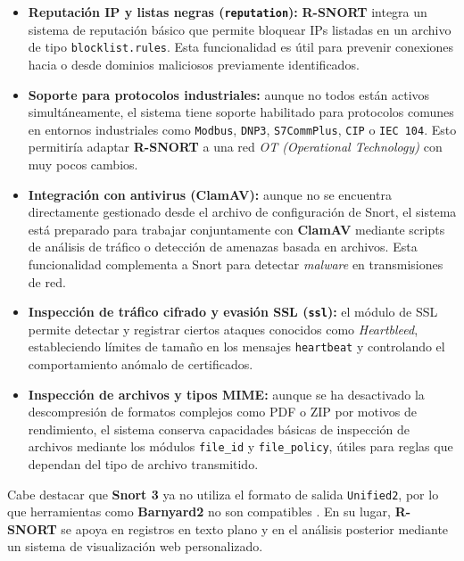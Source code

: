 \documentclass[11pt,a4paper,twoside]{report}
\begin{document}
\begin{itemize}
	\item \textbf{Reputación IP y listas negras (\texttt{reputation}):}  
	\textbf{R-SNORT} integra un sistema de reputación básico que permite bloquear IPs listadas en un archivo de tipo \texttt{blocklist.rules}. Esta funcionalidad es útil para prevenir conexiones hacia o desde dominios maliciosos previamente identificados.
	
	\item \textbf{Soporte para protocolos industriales:}  
	aunque no todos están activos simultáneamente, el sistema tiene soporte habilitado para protocolos comunes en entornos industriales como \texttt{Modbus}, \texttt{DNP3}, \texttt{S7CommPlus}, \texttt{CIP} o \texttt{IEC 104}. Esto permitiría adaptar \textbf{R-SNORT} a una red \textit{OT (Operational Technology)} con muy pocos cambios.
	
	\item \textbf{Integración con antivirus (ClamAV):}  
	aunque no se encuentra directamente gestionado desde el archivo de configuración de Snort, el sistema está preparado para trabajar conjuntamente con \textbf{ClamAV} mediante scripts de análisis de tráfico o detección de amenazas basada en archivos. Esta funcionalidad complementa a Snort para detectar \textit{malware} en transmisiones de red.
	
	\item \textbf{Inspección de tráfico cifrado y evasión SSL (\texttt{ssl}):}  
	el módulo de SSL permite detectar y registrar ciertos ataques conocidos como \textit{Heartbleed}, estableciendo límites de tamaño en los mensajes \texttt{heartbeat} y controlando el comportamiento anómalo de certificados.
	
	\item \textbf{Inspección de archivos y tipos MIME:}  
	aunque se ha desactivado la descompresión de formatos complejos como PDF o ZIP por motivos de rendimiento, el sistema conserva capacidades básicas de inspección de archivos mediante los módulos \texttt{file\_id} y \texttt{file\_policy}, útiles para reglas que dependan del tipo de archivo transmitido.
\end{itemize}

Cabe destacar que \textbf{Snort 3} ya no utiliza el formato de salida \texttt{Unified2}, por lo que herramientas como \textbf{Barnyard2} no son compatibles \cite{snort_gui_update}. En su lugar, \textbf{R-SNORT} se apoya en registros en texto plano y en el análisis posterior mediante un sistema de visualización web personalizado.
\end{document}
